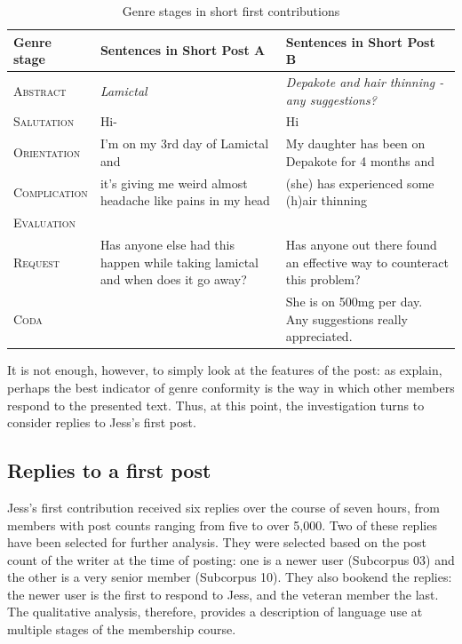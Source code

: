 \documentclass{article}
\begin{document}
\begin{table}[htb]
\small\centering
\begin{tabularx}{\textwidth}{lXX}
\toprule
Genre stage  & Sentences in Short Post A  & Sentences in Short Post B \\ \midrule
\textsc{Abstract}     & \emph{Lamictal}  & \emph{Depakote and hair thinning - any suggestions?}  \\
\textsc{Salutation}   & Hi-                                                                              & Hi                                                                      \\
\textsc{Orientation}  & I'm on my 3rd day of Lamictal and                                                & My daughter has been on Depakote for 4 months and                       \\
\textsc{Complication} & it's giving me weird almost headache like pains in my head                       & (she) has experienced some (h)air thinning                              \\
\textsc{Evaluation}   & ~                                                                                & ~                                                                       \\
\textsc{Request }     & Has anyone else had this happen while taking lamictal and when does it go away? & Has anyone out there found an effective way to counteract this problem? \\
\textsc{Coda}         & ~                                                                                & She is on 500mg per day. Any suggestions really appreciated.            \\
\bottomrule
\end{tabularx}
\caption{Genre stages in short first contributions}
\label{tab:two-genre-stage-analyses}
\end{table}
%
It is not enough, however, to simply look at the features of the post: as \textcite{eggins_analysing_2004} explain, perhaps the best indicator of genre conformity is the way in which other members respond to the presented text. Thus, at this point, the investigation turns to consider replies to Jess's first post.

\subsection{Replies to a first post}

Jess's first contribution received six replies over the course of seven hours, from members with post counts ranging from five to over 5,000. Two of these replies have been selected for further analysis. They were selected based on the post count of the writer at the time of posting: one is a newer user (Subcorpus 03) and the other is a very senior member (Subcorpus 10). They also bookend the replies: the newer user is the first to respond to Jess, and the veteran member the last. The qualitative analysis, therefore, provides a description of language use at multiple stages of the membership course.
\end{document}
